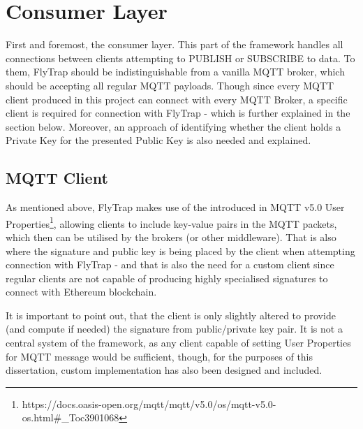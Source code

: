 \section{Consumer Layer}
First and foremost, the consumer layer. This part of the framework handles all connections between clients attempting to PUBLISH or SUBSCRIBE to data. To them, FlyTrap should be indistinguishable from a vanilla MQTT broker, which should be accepting all regular MQTT payloads. Though since every MQTT client produced in this project can connect with every MQTT Broker, a specific client is required for connection with FlyTrap - which is further explained in the section below. Moreover, an approach of identifying whether the client holds a Private Key for the presented Public Key is also needed and explained. 
\subsection{MQTT Client}
As mentioned above, FlyTrap makes use of the introduced in MQTT v5.0 User Properties\footnote{https://docs.oasis-open.org/mqtt/mqtt/v5.0/os/mqtt-v5.0-os.html\#\_Toc3901068}, allowing clients to include key-value pairs in the MQTT packets, which then can be utilised by the brokers (or other middleware). That is also where the signature and public key is being placed by the client when attempting connection with FlyTrap - and that is also the need for a custom client since regular clients are not capable of producing highly specialised signatures to connect with Ethereum blockchain.

It is important to point out, that the client is only slightly altered to provide (and compute if needed) the signature from public/private key pair. It is not a central system of the framework, as any client capable of setting User Properties for MQTT message would be sufficient, though, for the purposes of this dissertation, custom implementation has also been designed and included.
